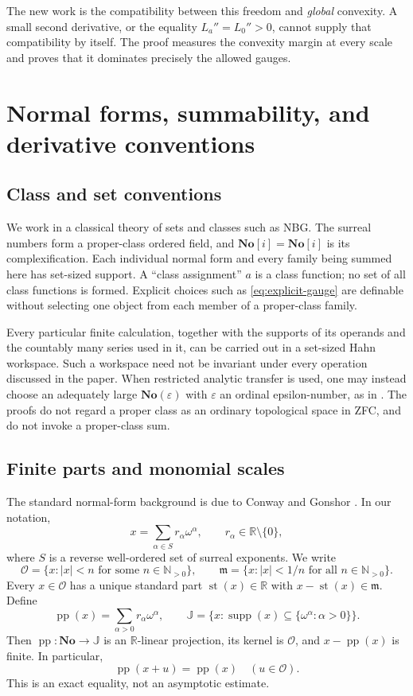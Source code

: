 \documentclass[11pt,letterpaper]{article}
\numberwithin{equation}{section}
\theoremstyle{plain}
\theoremstyle{definition}
\theoremstyle{remark}
\newcommand{\No}{\mathbf{No}}
\newcommand{\SC}{\mathbf{No}[i]}
\newcommand{\R}{\mathbb R}
\newcommand{\N}{\mathbb N}
\newcommand{\Ocal}{\mathcal O}
\newcommand{\mi}{\mathfrak m}
\newcommand{\J}{\mathbb J}
\newcommand{\pp}{\operatorname{pp}}
\newcommand{\st}{\operatorname{st}}
\newcommand{\supp}{\operatorname{supp}}
\newcommand{\abs}[1]{\lvert#1\rvert}
\begin{document}
The new work is the compatibility between this freedom and \emph{global}
convexity. A small second derivative, or the equality $L_a''=L_0''>0$, cannot
supply that compatibility by itself. The proof measures the convexity margin
at every scale and proves that it dominates precisely the allowed gauges.

\section{Normal forms, summability, and derivative conventions}
\label{sec:preliminaries}

\subsection{Class and set conventions}
We work in a classical theory of sets and classes such as NBG. The surreal
numbers form a proper-class ordered field, and $\SC=\No[i]$ is its
complexification. Each individual normal form and every family being summed
here has set-sized support. A ``class assignment'' $a$ is a class function;
no set of all class functions is formed. Explicit choices such as
\eqref{eq:explicit-gauge} are definable without selecting one object from
each member of a proper-class family.

Every particular finite calculation, together with the supports of its
operands and the countably many series used in it, can be carried out in a
set-sized Hahn workspace. Such a workspace need not be invariant under every
operation discussed in the paper. When restricted analytic transfer is used,
one may instead choose an adequately large $\No(\varepsilon)$ with
$\varepsilon$ an ordinal epsilon-number, as in \cite{vdDE}.
The proofs do not regard a proper class as an ordinary topological space in
ZFC, and do not invoke a proper-class sum.

\subsection{Finite parts and monomial scales}
The standard normal-form background is due to Conway and Gonshor
\cite{Conway,Gonshor}. In our notation,
\begin{equation}\label{eq:normal-form}
 x=\sum_{\alpha\in S}r_\alpha\omega^\alpha,
 \qquad r_\alpha\in\R\setminus\{0\},
\end{equation}
where $S$ is a reverse well-ordered set of surreal exponents. We write
\[
 \Ocal=\{x:\abs{x}<n\text{ for some }n\in\N_{>0}\},\qquad
 \mi=\{x:\abs{x}<1/n\text{ for all }n\in\N_{>0}\}.
\]
Every $x\in\Ocal$ has a unique standard part $\st(x)\in\R$ with
$x-\st(x)\in\mi$. Define
\[
 \pp(x)=\sum_{\alpha>0}r_\alpha\omega^\alpha,
 \qquad \J=\{x:\supp(x)\subseteq\{\omega^\alpha:\alpha>0\}\}.
\]
Then $\pp:\No\to\J$ is an $\R$-linear projection, its kernel is
$\Ocal$, and $x-\pp(x)$ is finite. In particular,
\begin{equation}\label{eq:pp-translation}
 \pp(x+u)=\pp(x)\quad(u\in\Ocal).
\end{equation}
This is an exact equality, not an asymptotic estimate.
\end{document}

